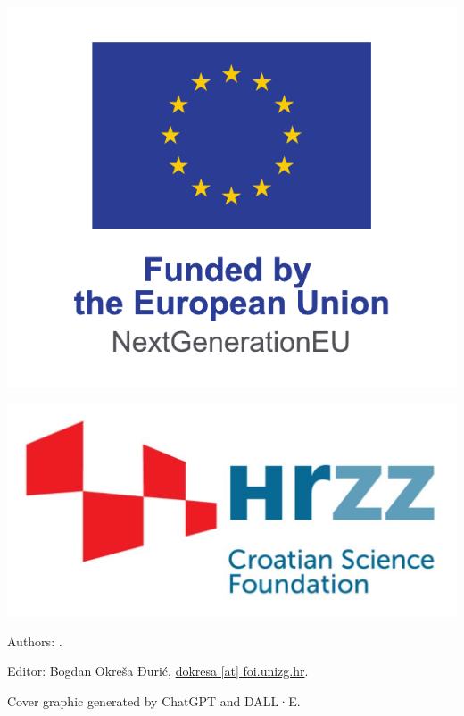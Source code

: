 \cleardoublepage

\begin{fullwidth}
\thispagestyle{empty}
\setlength{\parindent}{0pt}


\setlength{\parskip}{\baselineskip}

\vfill

\begin{multicols}{2}
    \centering
    \includegraphics[width=0.7\linewidth]{LaTeX Templates/Common Figures/EU logo EN.pdf}

    \includegraphics[width=0.7\linewidth]{LaTeX Templates/Common Figures/HRZZ logo EN.pdf}
\end{multicols}

\vfill

Authors: \thanklessauthor.

Editor: Bogdan Okreša Đurić, \href{mailto:Bogdan Okresa Duric <dokresa@foi.unizg.hr>}{dokresa [at] foi.unizg.hr}.

Cover graphic generated by ChatGPT and DALL·E.


\end{fullwidth}
